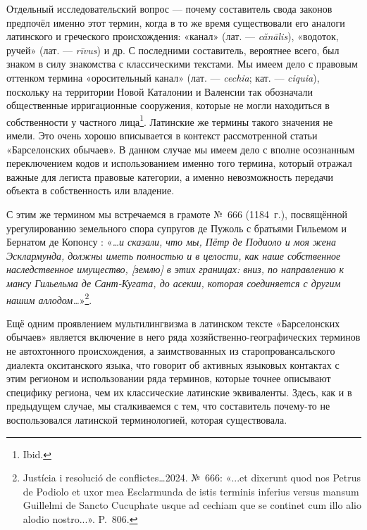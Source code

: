 Отдельный исследовательский вопрос --- почему составитель свода законов предпочёл именно этот термин, когда в то же время существовали его аналоги латинского и греческого происхождения: «канал» (лат. --- \emph{cănālis}), «водоток, ручей» (лат. --- \emph{rīvus}) и др. С последними составитель, вероятнее всего, был знаком в силу знакомства с классическими текстами. Мы имеем дело с правовым оттенком термина «оросительный канал» (лат. --- \emph{cechia}; кат. ---\emph{ }\emph{ciquia}), поскольку на территории Новой Каталонии и Валенсии так обозначали общественные ирригационные сооружения, которые не могли находиться в собственности у частного лица\footnote{Ibid.}. Латинские же термины такого значения не имели. Это очень хорошо вписывается в контекст рассмотренной статьи «Барселонских обычаев». В данном случае мы имеем дело с вполне осознанным переключением кодов и использованием именно того термина, который отражал важные для легиста правовые категории, а именно невозможность передачи объекта в собственность или владение.

С этим же термином мы встречаемся в грамоте №~666 (1184~г.), посвящённой урегулированию земельного спора супругов де Пужоль с братьями Гильемом и Бернатом де Копонсу : «\emph{…и сказали, что мы, Пётр де Подиоло и моя жена Эсклармунда, должны иметь полностью и в целости, как наше собственное наследственное имущество, [землю] в этих границах: вниз, по направлению к мансу Гильельма де Сант-Кугата, до асекии, которая соединяется с другим нашим аллодом…}»\footnote{Justícia i resolució de conflictes…2024. №~666: «...et dixerunt quod nos Petrus de Podiolo et uxor mea Esclarmunda de istis terminis inferius versus mansum Guillelmi de Sancto Cucuphate usque ad cechiam que se continet cum illo alio alodio nostro...». P.~806.}.

Ещё одним проявлением мультилингвизма в латинском тексте «Барселонских обычаев» является включение в него ряда хозяйственно-географических терминов не автохтонного происхождения, а заимствованных из старопровансальского диалекта окситанского языка, что говорит об активных языковых контактах с этим регионом и использовании ряда терминов, которые точнее описывают специфику региона, чем их классические латинские эквиваленты. Здесь, как и в предыдущем случае, мы сталкиваемся с тем, что составитель почему-то не воспользовался латинской терминологией, которая существовала.

